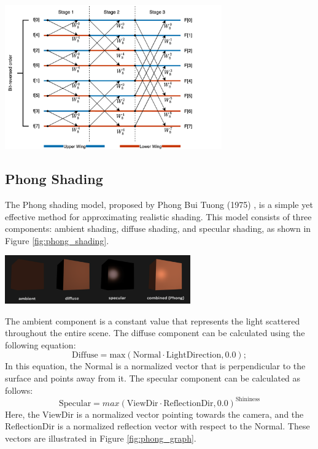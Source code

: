 \begin{minipage}{1\textwidth}
    \centering
    \includegraphics[width=0.7\textwidth]{"images/8_butterfly_diagram.png"}
    \label{fig:8_butterfly_diagram}
\end{minipage}

\subsection{Phong Shading}
The Phong shading model, proposed by Phong Bui Tuong (1975) \cite{phong1975}, is a simple yet effective method for approximating realistic shading. This model consists of three components: ambient shading, diffuse shading, and specular shading, as shown in Figure \ref{fig:phong_shading}.

\begin{minipage}{1\textwidth}
    \centering
    \includegraphics[width=0.6\textwidth]{"images/phong_shading.png"}
    \label{fig:phong_shading}
\end{minipage}

The ambient component is a constant value that represents the light scattered throughout the entire scene. The diffuse component can be calculated using the following equation:
\begin{equation}
    \text{Diffuse} = \text{max}(\text{Normal} \cdot \text{LightDirection}, 0.0);
\end{equation}
In this equation, the Normal is a normalized vector that is perpendicular to the surface and points away from it. The specular component can be calculated as follows:
\begin{equation}
    \text{Specular} = max(\text{ViewDir} \cdot \text{ReflectionDir}, 0.0)^{\text{Shininess}}
    \label{eq:phong_specular}
\end{equation}
Here, the ViewDir is a normalized vector pointing towards the camera, and the ReflectionDir is a normalized reflection vector with respect to the Normal. These vectors are illustrated in Figure \ref{fig:phong_graph}.

